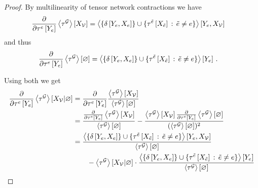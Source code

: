 \begin{proof}
    By multilinearity of tensor network contractions we have
    \begin{align*}
        \frac{\partial }{\partial \tau^{e}\left[Y_{e}\right]} \left\langle \tau^{\mathcal{G}}\right\rangle \left[ X_{\mathcal{V}} \right]
        & = \left\langle \{\delta\left[Y_{e},X_{e}\right]\}\cup\{\tau^{\tilde{e}}\left[X_{\tilde{e}}\right] \,:\, \tilde{e}\neq e \}\right\rangle \left[ Y_{e},X_{\mathcal{V}} \right]
    \end{align*}
    and thus
    \begin{align*}
        \frac{\partial }{\partial \tau^{e}\left[Y_{e}\right]} \left\langle \tau^{\mathcal{G}}\right\rangle \left[ \varnothing \right]
        & = \left\langle \{\delta\left[Y_{e},X_{e}\right]\}\cup\{\tau^{\tilde{e}}\left[X_{\tilde{e}}\right] \,:\, \tilde{e}\neq e \}\right\rangle \left[ Y_{e} \right] \, .
    \end{align*}

    Using both we get
    \begin{align}
        \frac{\partial }{\partial \tau^{e}\left[Y_{e}\right]} \left\langle \tau^{\mathcal{G}}\right\rangle \left[ X_{\mathcal{V}} | \varnothing \right]
        & = \frac{\partial }{\partial \tau^{e}\left[Y_{e}\right]}  \frac{\left\langle \tau^{\mathcal{G}}\right\rangle \left[ X_{\mathcal{V}} \right]}{\left\langle \tau^{\mathcal{G}}\right\rangle \left[ \varnothing \right]} \nonumber \\
        & = \frac{ \frac{\partial }{\partial \tau^{e}\left[Y_{e}\right]} \left\langle \tau^{\mathcal{G}}\right\rangle \left[ X_{\mathcal{V}} \right]}{\left\langle \tau^{\mathcal{G}}\right\rangle \left[ \varnothing \right]}
        - \frac{ \left\langle \tau^{\mathcal{G}}\right\rangle \left[ X_{\mathcal{V}} \right] \frac{\partial }{\partial \tau^{e}\left[Y_{e}\right]} \left\langle \tau^{\mathcal{G}}\right\rangle \left[ \varnothing \right] }{(\left\langle \tau^{\mathcal{G}}\right\rangle \left[ \varnothing \right])^2} \nonumber \\
        & = \frac{ \left\langle \{\delta\left[Y_{e},X_{e}\right]\}\cup\{\tau^{\tilde{e}}\left[X_{\tilde{e}}\right] \,:\, \tilde{e}\neq e \}\right\rangle \left[ Y_{e},X_{\mathcal{V}} \right]}{\left\langle \tau^{\mathcal{G}}\right\rangle \left[ \varnothing \right]} \nonumber \\
        & \quad\quad - \left\langle \tau^{\mathcal{G}}\right\rangle \left[ X_{\mathcal{V}} | \varnothing \right] \cdot  \frac{\left\langle \{\delta\left[Y_{e},X_{e}\right]\}\cup\{\tau^{\tilde{e}}\left[X_{\tilde{e}}\right] \,:\, \tilde{e}\neq e \}\right\rangle \left[ Y_{e} \right]}{\left\langle \tau^{\mathcal{G}}\right\rangle \left[ \varnothing \right]} \label{eq:differentiatingMNpreresult}
    \end{align}


\end{proof}
